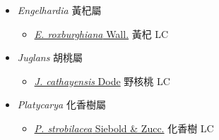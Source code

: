 
  \begin{itemize}
 \item[] \textit{Engelhardia} 黃杞屬
                    
  \begin{itemize}
        \item[] \href{http://www.theplantlist.org/tpl1.1/search?q=Engelhardia+roxburghiana}{\textit{E. roxburghiana} Wall.}   黃杞 LC
  \end{itemize}
 \item[] \textit{Juglans} 胡桃屬
                    
  \begin{itemize}
        \item[] \href{http://www.theplantlist.org/tpl1.1/search?q=Juglans+cathayensis}{\textit{J. cathayensis} Dode}   野核桃 LC
  \end{itemize}
 \item[] \textit{Platycarya} 化香樹屬
                    
  \begin{itemize}
        \item[] \href{http://www.theplantlist.org/tpl1.1/search?q=Platycarya+strobilacea}{\textit{P. strobilacea} Siebold \& Zucc.}   化香樹 LC
  \end{itemize}
  \end{itemize}
